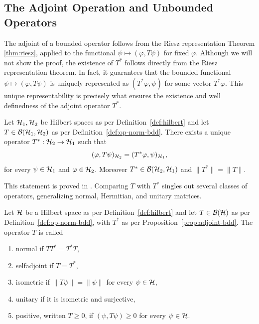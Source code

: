 \subsection*{The Adjoint Operation and Unbounded Operators}
\label{sec:unbounded}

The adjoint of a bounded operator follows from the Riesz representation Theorem \ref{thm:riesz}, applied to the functional $\psi\mapsto(\varphi,T\psi)$ for fixed $\varphi$. Although we will not show the proof, the existence of $T^*$ follows directly from the Riesz representation theorem. In fact, it guarantees that the bounded functional \(\psi\mapsto(\varphi,T\psi)\) is uniquely represented as \(( T^*\varphi,\psi)\) for some vector \(T^*\varphi\). This unique representability is precisely what ensures the existence and well definedness of the adjoint operator \(T^*\).

\begin{proposition}\label{prop:adjoint-bdd}
	Let $\H_1,\H_2$ be Hilbert spaces as per Definition~\ref{def:hilbert} and let $T\in\mathcal{B}(\H_1,\H_2)$ as per Definition~\ref{def:op-norm-bdd}. There exists a unique operator $T^{*}:\H_2\to\H_1$ such that
	\begin{equation}
		(\varphi,T\psi)_{\H_2}=( T^{*}\varphi,\psi)_{\H_1},
	\end{equation}
	for every $\psi\in\H_1$ and $\varphi\in\H_2$. Moreover $T^{*}\in\mathcal{B}(\H_2,\H_1)$ and $\|T^{*}\|=\|T\|$.
\end{proposition}

This statement is proved in \cite[Proposition 3.38]{morettiSpectralTheoryQuantum}. Comparing $T$ with $T^{*}$ singles out several classes of operators, generalizing normal, Hermitian, and unitary matrices.

\begin{definition}\label{def:special-classes}
	Let $\H$ be a Hilbert space as per Definition~\ref{def:hilbert} and let $T\in\mathcal{B}(\H)$ as per Definition~\ref{def:op-norm-bdd}, with $T^{*}$ as per Proposition~\ref{prop:adjoint-bdd}. The operator $T$ is called
	\begin{enumerate}
		\item normal if $TT^{*}=T^{*}T$,
		\item selfadjoint if $T=T^{*}$,
		\item isometric if $\|T\psi\|=\|\psi\|$ for every $\psi\in\H$,
		\item unitary if it is isometric and surjective,
		\item positive, written $T\geq 0$, if $(\psi,T\psi)\geq 0$ for every $\psi\in\H$.
	\end{enumerate}
\end{definition}


